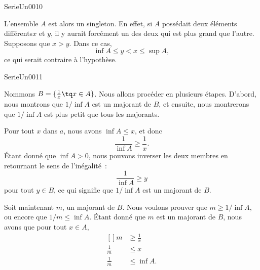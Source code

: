 \documentclass{article}
\begin{document}
\begin{corrige}{SerieUn0010}

	L'ensemble $A$ est alors un singleton. En effet, si $A$ possédait deux éléments différents$x$ et $y$, il y aurait forcément un des deux qui est plus grand que l'autre. Supposons que $x>y$. Dans ce cas,
	\begin{equation}
		\inf A\leq y<x\leq\sup A,
	\end{equation}
	ce qui serait contraire à l'hypothèse.

\end{corrige}


\begin{corrige}{SerieUn0011}

	Nommons $B=\{ \frac{1}{ x }\tq x\in A \}$. Nous allons procéder en plusieurs étapes. D'abord, nous montrons que $1/\inf A$ est un majorant de $B$, et ensuite, nous montrerons que $1/\inf A$ est plus petit que tous les majorants.
	
	Pour tout $x$ dans $a$, nous avons $\inf A\leq x$, et donc
	\begin{equation}
		\frac{1}{ \inf A }\geq \frac{1}{ x }.
	\end{equation}
	Étant donné que $\inf A>0$, nous pouvons inverser les deux membres en retournant le sens de l'inégalité~:
	\begin{equation}
		\frac{1}{ \inf A }\geq y
	\end{equation}
	pour tout $y\in B$, ce qui signifie que $1/\inf A$ est un majorant de $B$.

	Soit maintenant $m$, un majorant de $B$. Nous voulons prouver que $m\geq 1/\inf A$, ou encore que $1/m\leq \inf A$. Étant donné que $m$ est un majorant de $B$, nous avons que pour tout $x\in A$,
	\begin{equation}
		\begin{aligned}[]
			m		&\geq\frac{1}{ x }\\
			\frac{1}{ m }	&\leq x\\
			\frac{1}{ m }	&\leq\inf A.
		\end{aligned}
	\end{equation}

\end{corrige}
\end{document}
